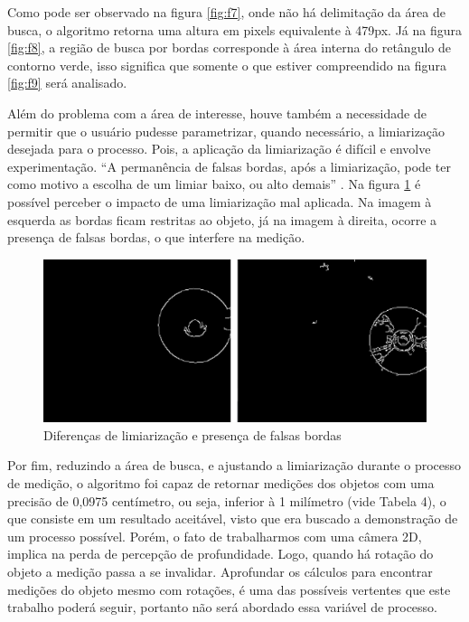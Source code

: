 \documentclass[12pt]{article}
\begin{document}
	Como pode ser observado na figura \ref{fig:f7}, onde não há delimitação da área de busca, o algoritmo retorna uma altura em pixels equivalente à 479px. Já na figura \ref{fig:f8}, a região de busca por bordas corresponde à área interna do retângulo de contorno verde, isso significa que somente o que estiver compreendido na figura \ref{fig:f9} será analisado.
	
	Além do problema com a área de interesse, houve também a necessidade de permitir que o usuário pudesse parametrizar, quando necessário, a limiarização desejada para o processo. Pois, a aplicação da limiarização é difícil e envolve experimentação. “A permanência de falsas bordas, após a limiarização, pode ter como motivo a escolha de um limiar baixo, ou alto demais” \citep[p. 9]{do2002processo}. Na figura \ref{fig:f10} é possível perceber o impacto de uma limiarização mal aplicada. Na imagem à esquerda as bordas ficam restritas ao objeto, já na imagem à direita, ocorre a presença de falsas bordas, o que interfere na medição.
	
	\begin{figure}[h!]
		\centering
		\includegraphics[width=0.7\linewidth]{img/F10}
		\caption{Diferenças de limiarização e presença de falsas bordas}
		\label{fig:f10}
	\end{figure}
			
	Por fim, reduzindo a área de busca, e ajustando a limiarização durante o processo de medição, o algoritmo foi capaz de retornar medições dos objetos com uma precisão de  0,0975 centímetro, ou seja, inferior à 1 milímetro (vide Tabela 4), o que consiste em um resultado aceitável, visto que era buscado a demonstração de um processo possível. Porém, o fato de trabalharmos com uma câmera 2D, implica na perda de percepção de profundidade. Logo, quando há rotação do objeto a medição passa a se invalidar. Aprofundar os cálculos para encontrar medições do objeto mesmo com rotações, é uma das possíveis vertentes que este trabalho poderá seguir, portanto não será abordado essa variável de processo. 
	
\end{document}
